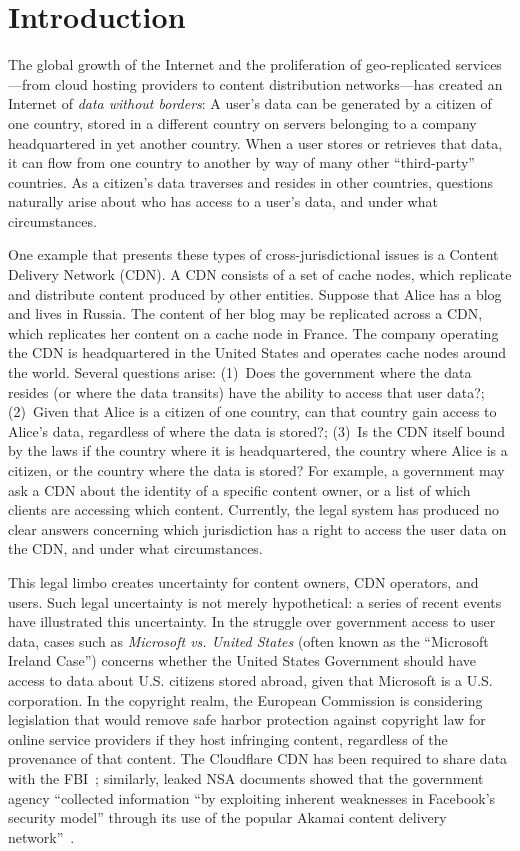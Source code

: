 \section{Introduction}
\label{sec:intro}

The global growth of the Internet and the proliferation of geo-replicated
services---from cloud hosting providers to content distribution networks---has
created an Internet of {\em data without borders}: A user's data can be
generated by a citizen of one country, stored in a different country on
servers belonging to a company headquartered in yet another country. When a
user stores or retrieves that data, it can flow from one country to another by
way of many other ``third-party'' countries. As a citizen's data traverses and resides
in other countries, questions naturally arise about who has access to a user's data,
and under what circumstances.

One example that presents these types of cross-jurisdictional issues is a
Content Delivery Network (CDN).  A CDN consists of a set of cache nodes, which
replicate  and distribute content produced by other entities.  Suppose that
Alice has a blog and lives in Russia.  The content of her blog may be
replicated across a CDN, which replicates her content on a cache node in France.
The company operating the CDN is headquartered in the United States and
operates cache nodes around the world. Several questions arise: (1)~Does the government
where the data resides (or where the data transits) have the ability to access that
user data?; (2)~Given that Alice is a citizen of one country, can that country gain
access to Alice's data, regardless of where the data is stored?; (3)~Is the CDN
itself bound by the laws if the country where it is headquartered, the country where
Alice is a citizen, or the country where the data is stored?
For example, a government may ask a CDN about the identity of a specific content
owner, or a list of
which clients are accessing which content.  
Currently, the legal system has produced no clear answers concerning which jurisdiction
has a right to access the user data on the CDN, and under what circumstances.  

This legal limbo creates uncertainty for content owners, CDN operators, and
users. Such legal uncertainty is not merely hypothetical: a series of recent
events have illustrated this uncertainty. In the struggle over government
access to user data, cases such as {\em Microsoft vs. United States} (often
known as the ``Microsoft Ireland Case'') concerns whether the United States
Government should have access to data about U.S. citizens stored abroad, given
that Microsoft is a U.S. corporation. In the copyright realm, the European
Commission is considering legislation that would remove safe harbor protection
against copyright law for online service providers if they host infringing
content, regardless of the provenance of that content. The Cloudflare CDN has
been required to share data with the FBI~\cite{cloudflare_gag}; similarly,
leaked  NSA documents showed that the government agency ``collected
information ``by exploiting inherent weaknesses  in Facebook's security model''
through its use of the popular Akamai content delivery network''~\cite{nsa_akamai}.

